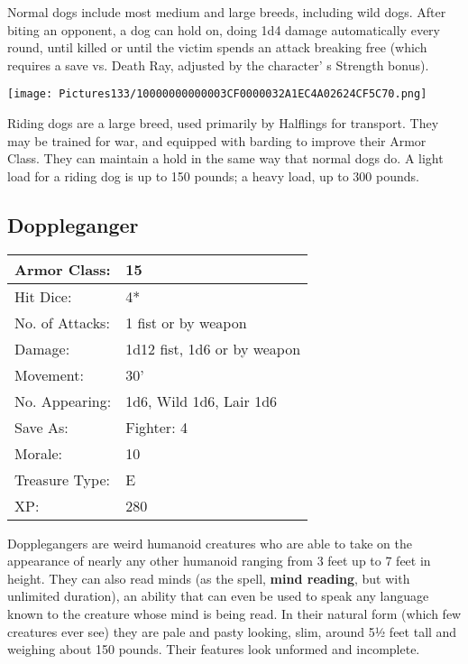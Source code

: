 \documentclass[a4paper,twoside,openany,10pt]{book}
\begin{document}
\begin{multicols}{2}
Normal dogs include most medium and large breeds, including wild dogs. After biting an opponent, a dog can hold on, doing 1d4 damage automatically every round, until killed or until the victim spends an attack breaking free (which requires a save vs. Death Ray, adjusted by the character' s Strength bonus).


\begin{center}
	\texttt{[image: Pictures133/10000000000003CF0000032A1EC4A02624CF5C70.png]}
\end{center}

Riding dogs are a large breed, used primarily by Halflings for transport. They may be trained for war, and equipped with barding to improve their Armor Class. They can maintain a hold in the same way that normal dogs do. A light load for a riding dog is up to 150 pounds; a heavy load, up to 300 pounds.

\subsection*{Doppleganger}\label{doppleganger}


\begin{tabularx}{0.48\textwidth}{@{}lX@{}}
Armor Class: & 15 \\\hline
Hit Dice: & 4* \\\hline
No. of Attacks: & 1 fist or by weapon \\\hline
Damage: & 1d12 fist, 1d6 or by weapon \\\hline
Movement: & 30' \\\hline
No. Appearing: & 1d6, Wild 1d6, Lair 1d6 \\\hline
Save As: & Fighter: 4 \\\hline
Morale: & 10 \\\hline
Treasure Type: & E \\\hline
XP: & 280 \\\hline
\end{tabularx}\medskip

Dopplegangers are weird humanoid creatures who are able to take on the appearance of nearly any other humanoid ranging from 3 feet up to 7 feet in height. They can also read minds (as the spell, \textbf{mind reading}, but with unlimited duration), an ability that can even be used to speak any language known to the creature whose mind is being read. In their natural form (which few creatures ever see) they are pale and pasty looking, slim, around 5½ feet tall and weighing about 150 pounds. Their features look unformed and incomplete.


\end{multicols}
\end{document}
